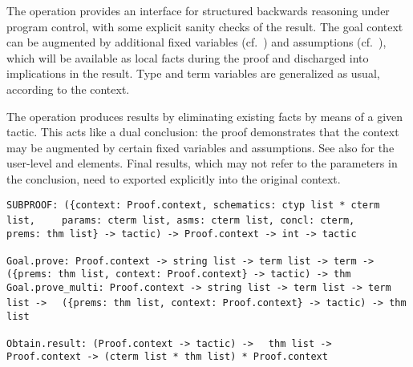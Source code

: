 \begin{isabellebody}
\begin{isamarkuptext}
  The  operation provides an interface for structured
  backwards reasoning under program control, with some explicit sanity
  checks of the result.  The goal context can be augmented by
  additional fixed variables (cf.\ ) and
  assumptions (cf.\ ), which will be available
  as local facts during the proof and discharged into implications in
  the result.  Type and term variables are generalized as usual,
  according to the context.

  The  operation produces results by eliminating
  existing facts by means of a given tactic.  This acts like a dual
  conclusion: the proof demonstrates that the context may be augmented
  by certain fixed variables and assumptions.  See also
  \cite{isabelle-isar-ref} for the user-level \isa{{\isasymOBTAIN}} and
  \isa{{\isasymGUESS}} elements.  Final results, which may not refer to
  the parameters in the conclusion, need to exported explicitly into
  the original context.%
\end{isamarkuptext}%
\isamarkuptrue%
%
\isadelimmlref
%
\endisadelimmlref
%
\isatagmlref
%
\begin{isamarkuptext}%
\begin{mldecls}
  \verb|SUBPROOF: ({context: Proof.context, schematics: ctyp list * cterm list,|\isasep\isanewline%
\verb|    params: cterm list, asms: cterm list, concl: cterm,|\isasep\isanewline%
\verb|    prems: thm list} -> tactic) -> Proof.context -> int -> tactic| \\
  \end{mldecls}
  \begin{mldecls}
  \verb|Goal.prove: Proof.context -> string list -> term list -> term ->|\isasep\isanewline%
\verb|  ({prems: thm list, context: Proof.context} -> tactic) -> thm| \\
  \verb|Goal.prove_multi: Proof.context -> string list -> term list -> term list ->|\isasep\isanewline%
\verb|  ({prems: thm list, context: Proof.context} -> tactic) -> thm list| \\
  \end{mldecls}
  \begin{mldecls}
  \verb|Obtain.result: (Proof.context -> tactic) ->|\isasep\isanewline%
\verb|  thm list -> Proof.context -> (cterm list * thm list) * Proof.context| \\
  \end{mldecls}


\end{isamarkuptext}
\end{isabellebody}
